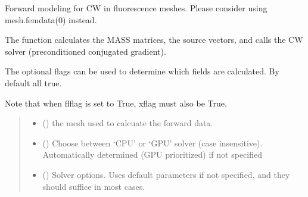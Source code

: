 \documentclass[letterpaper,10pt,english]{sphinxmanual}
\begin{document}
\begin{fulllineitems}
\label{\detokenize{_autosummary/nirfasterff.forward.femdata.femdata_fl_CW:nirfasterff.forward.femdata.femdata_fl_CW}}
\pysigstartsignatures
\pysiglinewithargsret
{}
{\sphinxparamcomma {}\sphinxparamcomma {}\sphinxparamcomma {}\sphinxparamcomma {}\sphinxparamcomma {}}
{}
\pysigstopsignatures
\sphinxAtStartPar
Forward modeling for CW in fluorescence meshes. Please consider using mesh.femdata(0) instead.

\sphinxAtStartPar
The function calculates the MASS matrices, the source vectors, and calls the CW solver (preconditioned conjugated gradient).

\sphinxAtStartPar
The optional flags can be used to determine which fields are calculated. By default all true.

\sphinxAtStartPar
Note that when flflag is set to True, xflag must also be True.
\begin{quote}\begin{description}
\begin{itemize}
\item {} 
\sphinxAtStartPar
{} () \textendash{} the mesh used to calcuate the forward data.

\item {} 
\sphinxAtStartPar
{} (\sphinxstyleliteralemphasis{\sphinxupquote{, }}) \textendash{} Choose between ‘CPU’ or ‘GPU’ solver (case insensitive). Automatically determined (GPU prioritized) if not specified

\item {} 
\sphinxAtStartPar
{} ({\hyperref[\detokenize{_autosummary/nirfasterff.utils.SolverOptions:nirfasterff.utils.SolverOptions}]{}}\sphinxstyleliteralemphasis{\sphinxupquote{, }}) \textendash{} 
\sphinxAtStartPar
Solver options. Uses default parameters if not specified, and they should suffice in most cases.


\end{itemize}
\end{description}
\end{quote}
\end{fulllineitems}
\end{document}
